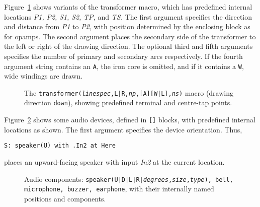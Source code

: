 Figure~\ref{Xform} shows variants of the transformer macro,
which has predefined internal locations
{\sl P1,} {\sl P2,} {\sl S1,} {\sl S2,} {\sl TP,} and {\sl TS.}
The first argument
specifies the direction and distance from {\sl P1} to {\sl P2}, with
position determined by the enclosing block as for opamps.  The second
argument places the secondary side of the transformer to the left
or right of the drawing direction.  The optional third and fifth arguments
specifies the number of primary and secondary arcs respectively.
If the fourth argument string contains an {\tt A}, the iron core
is omitted, and if it contains a {\tt W}, wide windings are drawn.
\begin{figure}[h!t]
   
  \caption{The {\tt transformer({\sl linespec},L|R,{\sl np},[A][W|L],{\sl ns})}
     macro (drawing direction {\tt down}), showing predefined terminal
     and centre-tap points.}
   \label{Xform}
   \end{figure}
\iffalse
A transformer with four connections is illustrated
in Figure~\ref{tran}.
\begin{figure}[hbt]
   \parbox{4in}{\small }%
   \quad\raise-0.2in\hbox{ }%
   \vspace{-\baselineskip}
   \caption{Showing the
    {\tt transformer({\sl linespec},L|R,np,A,ns)} macro.}
   \label{tran}
   \end{figure}
\fi

Figure~\ref{Audio} shows some audio devices, defined in {\tt []} blocks,
with predefined internal locations as shown.
The first argument specifies the device orientation.
Thus,

{\tt S: speaker(U) with .In2 at Here}

\noindent
places an upward-facing speaker with input {\sl In2} at the
current location.
\begin{figure}[ht!]
   
   \caption{Audio components:
   {\tt speaker(U|D|L|R|{\sl degrees},{\sl size},{\sl type}),
     bell, microphone, buzzer,
     earphone}, with their internally named positions and components.}
   \label{Audio}
   \end{figure}

